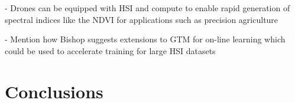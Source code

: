 \documentclass[remotesensing,article,submit,pdftex,moreauthors]{Definitions/mdpi}
\begin{document}
- Drones can be equipped with HSI and compute to enable rapid generation of spectral indices like the NDVI for applications such as precision agriculture \cite{horstrand2019uav}

- Mention how Bishop suggests extensions to GTM for on-line learning which could be used to accelerate training for large HSI datasets


\section{Conclusions}


\vspace{6pt} 




\end{document}
